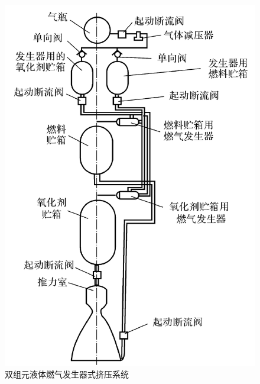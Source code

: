 \begin{enumerate}[\hspace*{1.5em} (1) ]
	\begin{figure}[!htb]
		\centering
		\includegraphics[width=0.35\linewidth]{pic/双组元液体.png}
		\caption{双组元液体燃气发生器式挤压系统}
		\label{双组元}
	\end{figure}
	

\end{enumerate}
